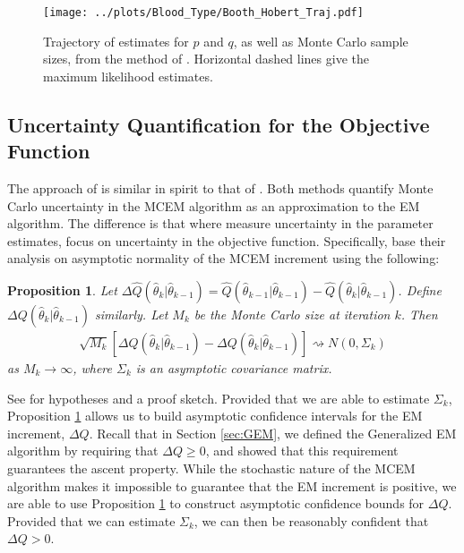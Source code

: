 \documentclass[11pt, oneside]{article}   	%
\newtheorem{proposition}{Proposition}[section]
\begin{document}
\begin{figure}
    \centering
    \caption{Trajectory of estimates for $p$ and $q$, as well as Monte Carlo sample sizes, from the method of \citeauthor{Boo99}. Horizontal dashed lines give the maximum likelihood estimates.}
    \label{fig:blood_BH_traj}
    \texttt{[image: ../plots/Blood\_Type/Booth\_Hobert\_Traj.pdf]}   
\end{figure}






\subsection{Uncertainty Quantification for the Objective Function \citep{Caf05}}
\label{sec:AMCEM}

The approach of \citet{Caf05} is similar in spirit to that of \citet{Boo99}. Both methods quantify Monte Carlo uncertainty in the MCEM algorithm as an approximation to the EM algorithm. The difference is that where \citeauthor{Boo99} measure uncertainty in the parameter estimates, \citeauthor{Caf05} focus on uncertainty in the objective function. Specifically, \citeauthor{Caf05} base their analysis on asymptotic normality of the MCEM increment using the following:
%
\begin{proposition}
    \label{thm2:Caf_normality}
    Let $\Delta \hat{Q}(\hat{\theta}_k|\hat{\theta}_{k-1}) = \hat{Q}(\hat{\theta}_{k-1}|\hat{\theta}_{k-1}) - \hat{Q}(\hat{\theta}_k|\hat{\theta}_{k-1})$. Define $\Delta Q(\hat{\theta}_k|\hat{\theta}_{k-1})$ similarly. Let $M_k$ be the Monte Carlo size at iteration $k$. Then
    \begin{align}
        \sqrt{M_k} \left[ \Delta \hat{Q}(\hat{\theta}_k|\hat{\theta}_{k-1}) - \Delta Q(\hat{\theta}_k|\hat{\theta}_{k-1}) \right] \rightsquigarrow N(0, \Sigma_k)
    \end{align}
    as $M_k \rightarrow \infty$, where $\Sigma_k$ is an asymptotic covariance matrix.
\end{proposition}

See \citeauthor{Caf05} for hypotheses and a proof sketch. Provided that we are able to estimate $\Sigma_k$, Proposition \ref{thm2:Caf_normality} allows us to build asymptotic confidence intervals for the EM increment, $\Delta Q$. Recall that in Section \ref{sec:GEM}, we defined the Generalized EM algorithm by requiring that $\Delta Q \geq 0$, and showed that this requirement guarantees the ascent property. While the stochastic nature of the MCEM algorithm makes it impossible to guarantee that the EM increment is positive, we are able to use Proposition \ref{thm2:Caf_normality} to construct asymptotic confidence bounds for $\Delta Q$. Provided that we can estimate $\Sigma_k$, we can then be reasonably confident that $\Delta Q > 0$.
\end{document}
